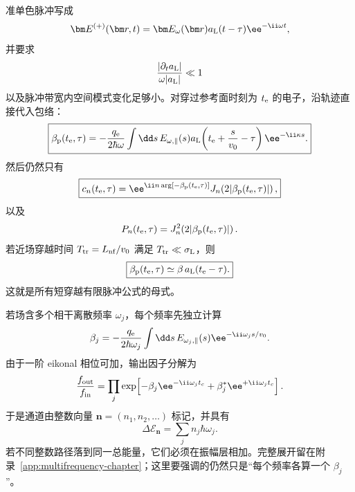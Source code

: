准单色脉冲写成
\begin{equation}
\bm E^{(+)}(\bm r,t)
=\bm E_\omega(\bm r)a_{\rm L}(t-\tau)\ee^{-\ii\omega t},
\end{equation}
并要求
\begin{equation}
\frac{|\partial_ta_{\rm L}|}{\omega|a_{\rm L}|}\ll1
\end{equation}
以及脉冲带宽内空间模式变化足够小。对穿过参考面时刻为 \(t_{\rm e}\) 的电子，沿轨迹直接代入包络：
\begin{equation}
\boxed{
\beta_{\rm p}(t_{\rm e},\tau)
=-\frac{q_{\rm e}}{2\hbar\omega}
\int\dd s\,
E_{\omega,\parallel}(s)
 a_{\rm L}\!\left(t_{\rm e}+\frac{s}{v_0}-\tau\right)
\ee^{-\ii\kappa s}.}
\label{eq:pulse-weighted-beta}
\end{equation}
然后仍然只有
\begin{equation}
\boxed{
 c_n(t_{\rm e},\tau)
 =\ee^{\ii n\arg[-\beta_{\rm p}(t_{\rm e},\tau)]}
 J_n\!\left(2|\beta_{\rm p}(t_{\rm e},\tau)|\right),}
\label{eq:pulse-local-sideband-amplitude}
\end{equation}
以及
\begin{equation}
P_n(t_{\rm e},\tau)=J_n^2\!\left(2|\beta_{\rm p}(t_{\rm e},\tau)|\right).
\end{equation}
若近场穿越时间 \(T_{\rm tr}=L_{\rm nf}/v_0\) 满足 \(T_{\rm tr}\ll\sigma_{\rm L}\)，则
\begin{equation}
\boxed{
\beta_{\rm p}(t_{\rm e},\tau)
\simeq\beta\,a_{\rm L}(t_{\rm e}-\tau).}
\label{eq:beta-local-def}
\end{equation}
这就是所有短穿越有限脉冲公式的母式。

若场含多个相干离散频率 \(\omega_j\)，每个频率先独立计算
\begin{equation}
\beta_j
=-\frac{q_{\rm e}}{2\hbar\omega_j}
\int\dd s\,E_{\omega_j,\parallel}(s)
\ee^{-\ii\omega_js/v_0}.
\end{equation}
由于一阶 eikonal 相位可加，输出因子分解为
\begin{equation}
\frac{f_{\rm out}}{f_{\rm in}}
=\prod_j
\exp\!\left[-\beta_j\ee^{-\ii\omega_jt_c}
+\beta_j^*\ee^{+\ii\omega_jt_c}\right].
\label{eq:multifrequency-product-main}
\end{equation}
于是通道由整数向量 \(\bm n=(n_1,n_2,\ldots)\) 标记，并具有
\begin{equation}
\boxed{
\Delta\mathcal E_{\bm n}
=\sum_jn_j\hbar\omega_j.}
\label{eq:multifrequency-energy-main}
\end{equation}
若不同整数路径落到同一总能量，它们必须在振幅层相加。完整展开留在附录~\ref{app:multifrequency-chapter}；这里要强调的仍然只是“每个频率各算一个 \(\beta_j\)”。

